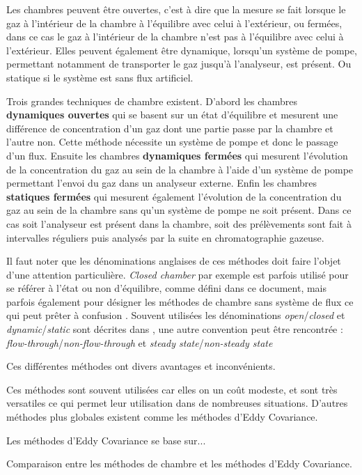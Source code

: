 Les chambres peuvent être ouvertes, c'est à dire que la mesure se fait lorsque le gaz à l'intérieur de la chambre à l'équilibre avec celui à l'extérieur, ou fermées, dans ce cas le gaz à l'intérieur de la chambre n'est pas à l'équilibre avec celui à l'extérieur.
Elles peuvent également être dynamique, lorsqu'un système de pompe, permettant notamment de transporter le gaz jusqu'à l'analyseur, est présent.
Ou statique si le système est sans flux artificiel.

Trois grandes techniques de chambre existent.
D'abord les chambres \textbf{dynamiques ouvertes} qui se basent sur un état d'équilibre et mesurent une différence de concentration d'un gaz dont une partie passe par la chambre et l'autre non. 
Cette méthode nécessite un système de pompe et donc le passage d'un flux.
Ensuite les chambres \textbf{dynamiques fermées} qui mesurent l'évolution de la concentration du gaz au sein de la chambre à l'aide d'un système de pompe permettant l'envoi du gaz dans un analyseur externe.
Enfin les chambres \textbf{statiques fermées} qui mesurent également l'évolution de la concentration du gaz au sein de la chambre sans qu'un système de pompe ne soit présent.
Dans ce cas soit l'analyseur est présent dans la chambre, soit des prélèvements sont fait à intervalles réguliers puis analysés par la suite en chromatographie gazeuse.

Il faut noter que les dénominations anglaises de ces méthodes doit faire l'objet d'une attention particulière.
\textit{Closed chamber} par exemple est parfois utilisé pour se référer à l'état ou non d'équilibre, comme défini dans ce document, mais parfois également pour désigner les méthodes de chambre sans système de flux ce qui peut prêter à confusion \cite{pumpanen2004}.
Souvent utilisées les dénominations \textit{open}/\textit{closed} et \textit{dynamic}/\textit{static} sont décrites dans \cite{luo2006161}, une autre convention peut être rencontrée : \textit{flow-through}/\textit{non-flow-through} et \textit{steady state}/\textit{non-steady state} \cite{livingston1995}

Ces différentes méthodes ont divers avantages et inconvénients.

Ces méthodes sont souvent utilisées car elles on un coût modeste, et sont très versatiles ce qui permet leur utilisation dans de nombreuses situations.
D'autres méthodes plus globales existent comme les méthodes d'Eddy Covariance.

Les méthodes d'Eddy Covariance se base sur...

Comparaison entre les méthodes de chambre et les méthodes d'Eddy Covariance.

